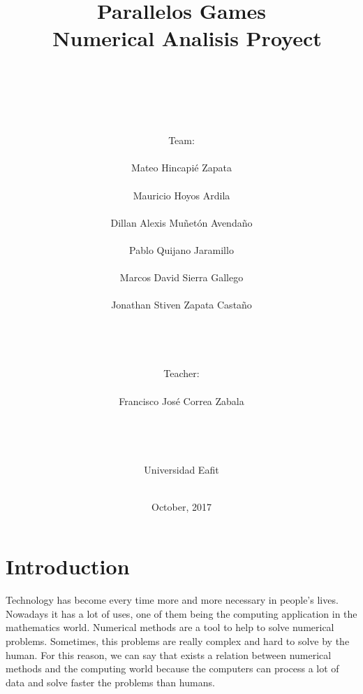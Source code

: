 \documentclass{article}
\begin{document}
\title{Parallelos Games\\\
Numerical Analisis Proyect}
\author{
\\\\\\\\\\
 Team:\\\\
  Mateo Hincapi\'e Zapata\\\\
  Mauricio Hoyos Ardila\\\\
  Dillan Alexis Muñet\'on Avendaño\\\\
  Pablo Quijano Jaramillo\\\\
  Marcos David Sierra Gallego\\\\
  Jonathan Stiven Zapata Castaño\\\\\\\\\\
  Teacher:\\\\
  Francisco Jos\'e Correa Zabala\\\\\\\\\\
  Universidad Eafit\\\\
  }
\date{October, 2017}

\maketitle

\newpage

\tableofcontents

\newpage

\section{Introduction}

Technology has become every time more and more necessary in people's lives. Nowadays it has a lot of uses, one of them being the computing application in the mathematics world. Numerical methods  are a tool to help to solve numerical
problems. Sometimes, this problems are really complex and hard to solve by
the human. For this reason, we can say that exists a relation between numerical
methods  and the computing world because the computers can process a lot of data
and solve faster the problems than humans.\\
\end{document}
